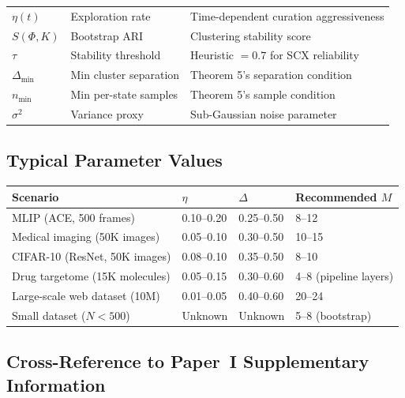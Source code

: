 \documentclass{article}
\begin{document}
\begin{longtable}{p{} p{} p{}}
$\eta(t)$ & Exploration rate & Time-dependent curation aggressiveness \\
$S(\Phi, K)$ & Bootstrap ARI & Clustering stability score \\
$\tau$ & Stability threshold & Heuristic $= 0.7$ for SCX reliability \\
$\Delta_{\min}$ & Min cluster separation & Theorem 5's separation condition \\
$n_{\min}$ & Min per-state samples & Theorem 5's sample condition \\
$\sigma^2$ & Variance proxy & Sub-Gaussian noise parameter \\
\end{longtable}

\subsection{Typical Parameter Values}

\begin{longtable}{p{} p{} p{} p{}}
\toprule
\textbf{Scenario} & $\eta$ & $\Delta$ & \textbf{Recommended $M$} \\
\midrule
\endhead

\bottomrule
\endfoot

MLIP (ACE, 500 frames) & 0.10--0.20 & 0.25--0.50 & 8--12 \\
Medical imaging (50K images) & 0.05--0.10 & 0.30--0.50 & 10--15 \\
CIFAR-10 (ResNet, 50K images) & 0.08--0.10 & 0.35--0.50 & 8--10 \\
Drug targetome (15K molecules) & 0.05--0.15 & 0.30--0.60 & 4--8 (pipeline layers) \\
Large-scale web dataset (10M) & 0.01--0.05 & 0.40--0.60 & 20--24 \\
Small dataset ($N < 500$) & Unknown & Unknown & 5--8 (bootstrap) \\
\end{longtable}

\subsection{Cross-Reference to Paper~I Supplementary Information}
\end{document}
